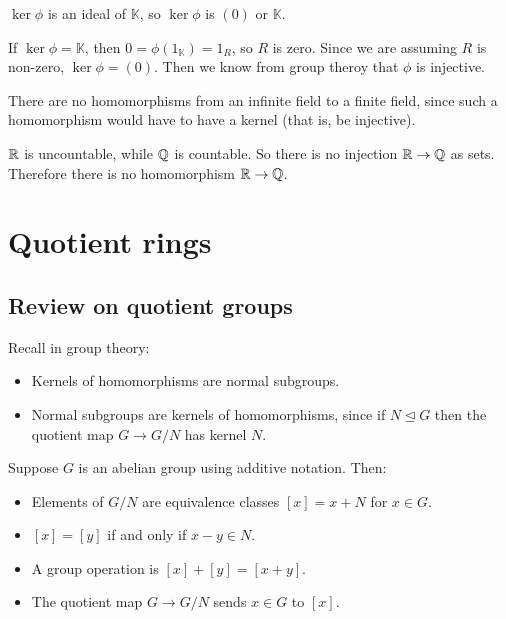 \documentclass[12pt,letterpaper]{report}
\begin{document}
\begin{thmproof}
  $\ker\phi$ is an ideal of $\mathbb{K}$, so $\ker\phi$ is $(0)$ or $\mathbb{K}$.

  If $\ker\phi = \mathbb{K}$, then $0 = \phi(1_\mathbb{K}) = 1_R$, so $R$ is zero.
  Since we are assuming $R$ is non-zero, $\ker\phi = (0)$.
  Then we know from group theroy that $\phi$ is injective.
\end{thmproof}

\begin{ex}
  There are no homomorphisms from an infinite field to a finite field, since such a homomorphism
  would have to have a kernel (that is, be injective).
\end{ex}

\begin{ex}
  $\mathbb{R}$ is uncountable, while $\mathbb{Q}$ is countable.
  So there is no injection $\mathbb{R} \to \mathbb{Q}$ as sets.
  Therefore there is no homomorphism $\mathbb{R} \to \mathbb{Q}$.
\end{ex}

\section{Quotient rings}

\subsection{Review on quotient groups}

Recall in group theory:
\begin{itemize}
  \item Kernels of homomorphisms are normal subgroups.
  \item Normal subgroups are kernels of homomorphisms, since if $N \trianglelefteq G$ then the
    quotient map $G \to G/N$ has kernel $N$.
\end{itemize}

Suppose $G$ is an abelian group using additive notation.
Then:
\begin{itemize}
  \item Elements of $G/N$ are equivalence classes $[x] = x + N$ for $x \in G$.
  \item $[x] = [y]$ if and only if $x - y \in N$.
  \item A group operation is $[x] + [y] = [x + y]$.
  \item The quotient map $G \to G/N$ sends $x \in G$ to $[x]$.
\end{itemize}
\end{document}
